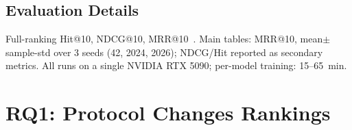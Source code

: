 \documentclass[sigconf,natbib=true,anonymous]{acmart}
\begin{document}
\subsection{Evaluation Details}

Full-ranking Hit@10, NDCG@10, MRR@10~\cite{krichene2020sampledmetrics}.
Main tables: MRR@10, mean$\pm$sample-std over 3 seeds (42, 2024, 2026); NDCG/Hit reported as secondary metrics.
All runs on a single NVIDIA RTX 5090; per-model training: 15--65~min.

\section{RQ1: Protocol Changes Rankings}
\label{sec:rq1}
\end{document}
